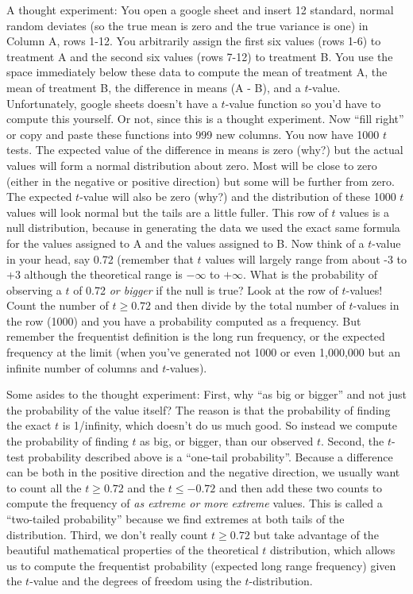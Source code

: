 \documentclass[]{book}
\theoremstyle{definition}
\theoremstyle{definition}
\theoremstyle{definition}
\theoremstyle{remark}
\begin{document}
A thought experiment: You open a google sheet and insert 12 standard,
normal random deviates (so the true mean is zero and the true variance
is one) in Column A, rows 1-12. You arbitrarily assign the first six
values (rows 1-6) to treatment A and the second six values (rows 7-12)
to treatment B. You use the space immediately below these data to
compute the mean of treatment A, the mean of treatment B, the difference
in means (A - B), and a \(t\)-value. Unfortunately, google sheets
doesn't have a \(t\)-value function so you'd have to compute this
yourself. Or not, since this is a thought experiment. Now ``fill right''
or copy and paste these functions into 999 new columns. You now have
1000 \(t\) tests. The expected value of the difference in means is zero
(why?) but the actual values will form a normal distribution about zero.
Most will be close to zero (either in the negative or positive
direction) but some will be further from zero. The expected \(t\)-value
will also be zero (why?) and the distribution of these 1000 \(t\) values
will look normal but the tails are a little fuller. This row of \(t\)
values is a null distribution, because in generating the data we used
the exact same formula for the values assigned to A and the values
assigned to B. Now think of a \(t\)-value in your head, say 0.72
(remember that \(t\) values will largely range from about -3 to +3
although the theoretical range is \(-\infty\) to \(+\infty\). What is
the probability of observing a \(t\) of 0.72 \emph{or bigger} if the
null is true? Look at the row of \(t\)-values! Count the number of
\(t \ge 0.72\) and then divide by the total number of \(t\)-values in
the row (1000) and you have a probability computed as a frequency. But
remember the frequentist definition is the long run frequency, or the
expected frequency at the limit (when you've generated not 1000 or even
1,000,000 but an infinite number of columns and \(t\)-values).

Some asides to the thought experiment: First, why ``as big or bigger''
and not just the probability of the value itself? The reason is that the
probability of finding the exact \(t\) is 1/infinity, which doesn't do
us much good. So instead we compute the probability of finding \(t\) as
big, or bigger, than our observed \(t\). Second, the \(t\)-test
probability described above is a ``one-tail probability''. Because a
difference can be both in the positive direction and the negative
direction, we usually want to count all the \(t \ge 0.72\) and the
\(t \le -0.72\) and then add these two counts to compute the frequency
of \emph{as extreme or more extreme} values. This is called a
``two-tailed probability'' because we find extremes at both tails of the
distribution. Third, we don't really count \(t \ge 0.72\) but take
advantage of the beautiful mathematical properties of the theoretical
\(t\) distribution, which allows us to compute the frequentist
probability (expected long range frequency) given the \(t\)-value and
the degrees of freedom using the \(t\)-distribution.
\end{document}
